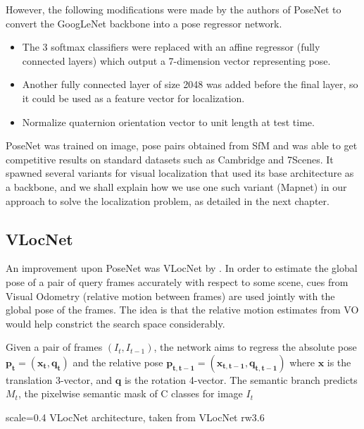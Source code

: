However, the following modifications were made by the authors of PoseNet to convert the GoogLeNet backbone into a pose regressor network. 

\begin{itemize}
	\item The 3 softmax classifiers were replaced with an affine regressor (fully connected layers) which output a 7-dimension vector representing pose.\\
	
	\item Another fully connected layer of size 2048 was added before the final layer, so it could be used as a feature vector for localization. \\
	
	\item Normalize quaternion orientation vector to unit length at test time. \\ 
\end{itemize}

PoseNet was trained on image, pose pairs obtained from SfM and was able to get competitive results on standard datasets such as Cambridge and 7Scenes. It spawned several variants for visual localization that used its base architecture as a backbone, and we shall explain how we use one such variant (Mapnet) in our approach to solve the localization problem, as detailed in the next chapter. 

\subsection{VLocNet} %
An improvement upon PoseNet was VLocNet by \cite{Valada2018}. In order to estimate the global pose of a pair of query frames accurately with respect to some scene, cues from 
Visual Odometry (relative motion between frames) are used jointly with the global pose of the frames. The idea is that the relative motion estimates from VO would help constrict 
the search space considerably. 

Given a pair of frames $(I_t, I_{t-1})$, the network aims to regress the absolute pose $\mathbf{p_t} = \mathbf{(x_t, q_t)}$ and the relative pose 
$\mathbf{p_{t, t-1}} = \mathbf{(x_{t, t-1}, q_{t, t-1})}$ where $\mathbf{x}$ is the translation 3-vector, and $\mathbf{q}$ is the rotation 4-vector. The semantic 
branch predicts $M_t$, the pixelwise semantic mask of C classes for image $I_t$ 

{scale=0.4}%
{VLocNet architecture, taken from \cite{Valada2018}}%
{VLocNet}%
{rw3.6} %

